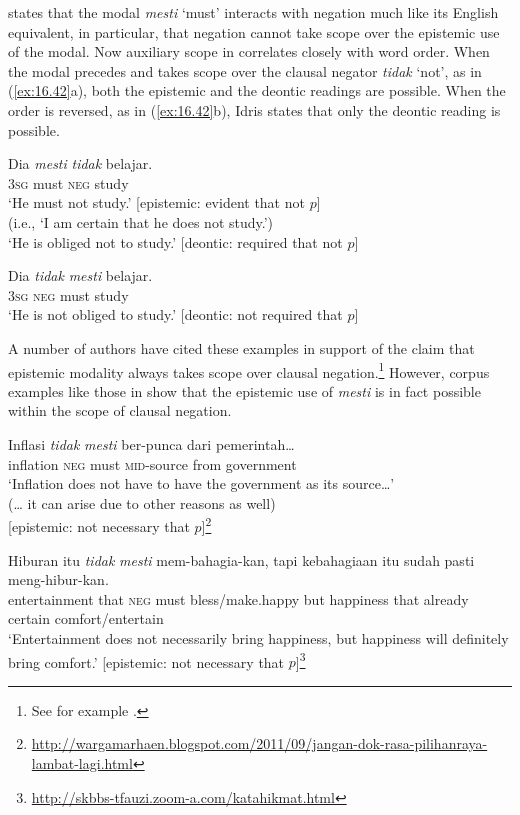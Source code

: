 \citet{Idris1980} states that the  modal \textit{mesti} ‘must’ interacts with negation much like its English equivalent, in particular, that negation cannot take scope over the epistemic use of the modal. Now auxiliary scope in  correlates closely with word order. When the modal precedes and takes scope over the clausal negator \textit{tidak} ‘not’, as in (\ref{ex:16.42}a), both the epistemic and the deontic readings are possible. When the order is reversed, as in (\ref{ex:16.42}b), Idris states that only the deontic reading is possible.


\ea \label{ex:16.42}
\ea  \gll Dia  \textit{mesti}  \textit{tidak}  belajar.\\
\textsc{3sg}  must  \textsc{neg}  study\\
\glt ‘He must not study.’  \hfill [epistemic: evident that not $p$] \\
\hspace{1cm} (i.e., ‘I am certain that he does not study.’) \\
‘He is obliged not to study.’  \hfill [deontic: required that not $p$]

\ex \gll Dia  \textit{tidak}  \textit{mesti}  belajar.\\
\textsc{3sg}  \textsc{neg}  must  study\\
\glt ‘He is not obliged to study.’ \hfill [deontic: not required that $p$]
\z \z


A number of authors have cited these examples in support of the claim that epistemic modality always takes scope over clausal negation.\footnote{See for example \citet{deHaan1997,Drubig2001}.} However, corpus examples like those in  show that the epistemic use of \textit{mesti} is in fact possible within the scope of clausal negation.


\ea \label{ex:16.43}
\ea  \gll Inflasi  \textit{tidak}  \textit{mesti}  ber-punca  dari  pemerintah…\\
inflation  \textsc{neg}  must  \textsc{mid}-source  from  government\\
\glt ‘Inflation does not have to have the government as its source…’\\
(… it can arise due to other reasons as well) \\ \hfill  [epistemic: not necessary that $p$]\footnote{\url{http://wargamarhaen.blogspot.com/2011/09/jangan-dok-rasa-pilihanraya-lambat-lagi.html}}

\ex 
\gll  Hiburan  itu  \textit{tidak}  \textit{mesti}  mem-bahagia-kan,  tapi kebahagiaan  itu  sudah  pasti  meng-hibur-kan.\\
entertainment  that  \textsc{neg}  must  bless/make.happy  but happiness  that  already  certain  comfort/entertain\\
\glt ‘Entertainment does not necessarily bring happiness, but happiness will definitely bring comfort.’ \hfill  [epistemic: not necessary that $p$]\footnote{\url{http://skbbs-tfauzi.zoom-a.com/katahikmat.html}}
\z
\z

